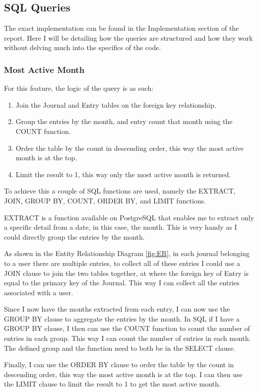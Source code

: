 \subsection{SQL Queries}
The exact implementation can be found in the Implementation section of the report. Here I will be detailing how the queries are structured and how they work without delving much into the specifics of the code.

\subsubsection{Most Active Month}
For this feature, the logic of the query is as such:
\begin{enumerate}
    \item Join the Journal and Entry tables on the foreign key relationship.
    \item Group the entries by the month, and entry count that month using the COUNT function.
    \item Order the table by the count in descending order, this way the most active month is at the top.
    \item Limit the result to 1, this way only the most active month is returned.

\end{enumerate}
To achieve this a couple of SQL functions are used, namely the EXTRACT, JOIN, GROUP BY, COUNT, ORDER BY, and LIMIT functions.

EXTRACT is a function available on PostgreSQL that enables me to extract only a specific detail from a date, in this case, the month. This is very handy as I could directly group the entries by the month.

As shown in the Entity Relationship Diagram \ref{fig:ER}, in each journal belonging to a user there are multiple entries, to collect all of these entries I could use a JOIN clause to join the two tables together, at where the foreign key of Entry is equal to the primary key of the Journal. This way I can collect all the entries associated with a user.

Since I now have the months extracted from each entry, I can now use the GROUP BY clause to aggregate the entries by the month. In SQL if I have a GROUP BY clause, I then can use the COUNT function to count the number of entries in each group. This way I can count the number of entries in each month. The defined group and the function need to both be in the SELECT clause.

Finally, I can use the ORDER BY clause to order the table by the count in descending order, this way the most active month is at the top. I can then use the LIMIT clause to limit the result to 1 to get the most active month.

